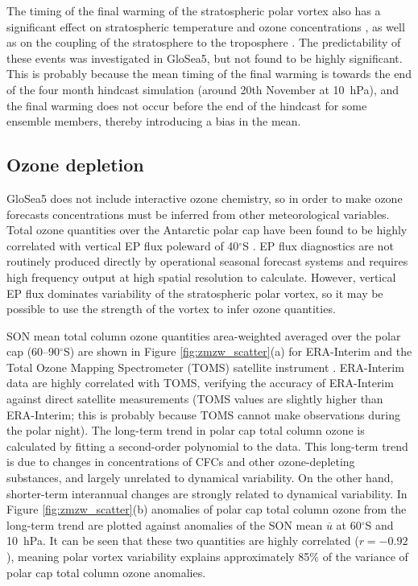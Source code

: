 The timing of the final warming of the stratospheric polar vortex also has a
significant effect on stratospheric temperature and ozone concentrations
\citep{Yamazaki1987}, as well as on the coupling of the stratosphere to the
troposphere \citep{Black2007}. The predictability of these events was
investigated in GloSea5, but not found to be highly significant. This is
probably because the mean timing of the final warming is towards the end of the
four month hindcast simulation (around 20th November at 10~hPa), and the final
warming does not occur before the end of the hindcast for some ensemble members,
thereby introducing a bias in the mean.

\subsection{Ozone depletion}
\label{sec:ozone-depletion}

GloSea5 does not include interactive ozone chemistry, so in order to make ozone
forecasts concentrations must be inferred from other meteorological
variables. Total ozone quantities over the Antarctic polar cap have been found
to be highly correlated with vertical EP flux poleward of 40$^{\circ}$S
\citep{Weber2011, Salby2012}. EP flux diagnostics are not routinely produced
directly by operational seasonal forecast systems and requires high frequency
output at high spatial resolution to calculate. However, vertical EP flux
dominates variability of the stratospheric polar vortex, so it may be possible
to use the strength of the vortex to infer ozone quantities.

SON mean total column ozone quantities area-weighted averaged over the polar cap
(60--90$^{\circ}$S) are shown in Figure \ref{fig:zmzw_scatter}(a) for
ERA-Interim and the Total Ozone Mapping Spectrometer (TOMS) satellite instrument
\citep{Kroon2008}. ERA-Interim data are highly correlated with TOMS, verifying
the accuracy of ERA-Interim against direct satellite measurements (TOMS values
are slightly higher than ERA-Interim; this is probably because TOMS cannot make
observations during the polar night). The long-term trend in polar cap total
column ozone is calculated by fitting a second-order polynomial to the
data. This long-term trend is due to changes in concentrations of CFCs and other
ozone-depleting substances, and largely unrelated to dynamical variability. On
the other hand, shorter-term interannual changes are strongly related to
dynamical variability. In Figure \ref{fig:zmzw_scatter}(b) anomalies of polar
cap total column ozone from the long-term trend are plotted against anomalies of
the SON mean $\overline{u}$ at 60$^{\circ}$S and 10~hPa. It can be seen that
these two quantities are highly correlated ($r=-0.92$), meaning polar vortex
variability explains approximately 85\% of the variance of polar cap total
column ozone anomalies.

